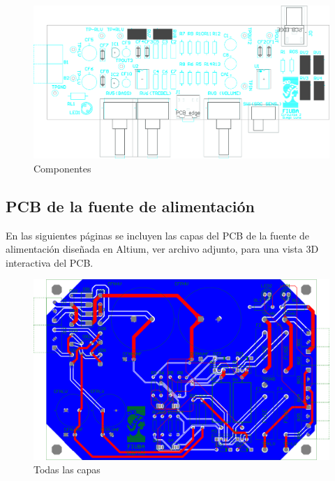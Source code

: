 \clearpage

\begin{figure}[H]
    \centering
    \includegraphics[width=150mm, angle=90]{img/PCB/layers/preamp/top-overlay.png}
    \caption{\footnotesize{Componentes}}
    \label{fig:pcb_preamp_top_overlay}
\end{figure}

\clearpage



\subsection{PCB de la fuente de alimentación}

En las siguientes páginas se incluyen las capas del PCB de la fuente de alimentación diseñada en Altium, ver archivo adjunto, \textbf{} para una vista 3D interactiva del PCB.

\clearpage

\begin{figure}[H]
    \centering
    \includegraphics[width=150mm, angle=90]{img/PCB/layers/power_supply/all-2D.png}
    \caption{\footnotesize{Todas las capas}}
    \label{fig:pcb_preamp_all}
\end{figure}

